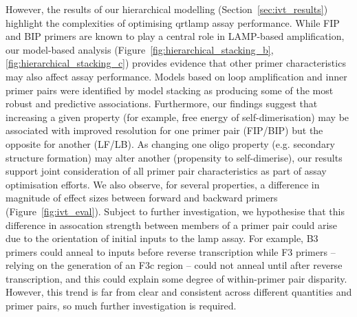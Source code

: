 \documentclass[../thesis.tex]{subfiles}
\begin{document}
However, the results of our hierarchical modelling (Section~\ref{sec:ivt_results}) highlight the complexities of optimising \gls{qrtlamp} assay performance. While FIP and BIP primers are known to play a central role in LAMP-based amplification, our model-based analysis (Figure~\ref{fig:hierarchical_stacking_b}, \ref{fig:hierarchical_stacking_c}) provides evidence that other primer characteristics may also affect assay performance. Models based on loop amplification and inner primer pairs were identified by model stacking as producing some of the most robust and predictive associations. Furthermore, our findings suggest that increasing a given property (for example, free energy of self-dimerisation) may be associated with improved resolution for one primer pair (FIP/BIP) but the opposite for another (LF/LB). As changing one oligo property (e.g. secondary structure formation) may alter another (propensity to self-dimerise), our results support joint consideration of all primer pair characteristics as part of assay optimisation efforts. %
We also observe, for several properties, a difference in 
magnitude %
of effect sizes between forward and backward primers (Figure~\ref{fig:ivt_eval}). Subject to further investigation, we hypothesise that this difference in 
assocation strength %
between members of a primer pair could arise due to the orientation of initial  inputs to the \gls{lamp} assay. For example, B3 primers could anneal to  inputs before reverse transcription while F3 primers -- relying on the generation of an F3c region -- could not anneal until after reverse transcription, and this could explain some degree of within-primer pair disparity. However, this trend is far from clear and consistent across different quantities and primer pairs, so much further investigation is required.
\end{document}

